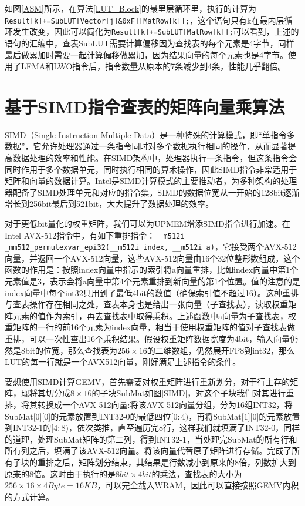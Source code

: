 如图\ref{ASM}所示，在算法\ref{LUT_Block}的最里层循环里，执行的计算为\verb|Result[k]+=SubLUT[Vector[j]&0xF][MatRow[k]];|，这个语句只有k在最内层循环发生改变，因此可以简化为\verb|Result[k]+=SubLUT[MatRow[k]];|可以看到，上述的语句的汇编中，查表SubLUT需要计算偏移因为查找表的每个元素是4字节，同样最后做累加时需要一起计算偏移做累加，因为结果向量的每个元素也是4字节。使用了LFMA和LWO指令后，指令数量从原本的7条减少到4条，性能几乎翻倍。

\section{基于SIMD指令查表的矩阵向量乘算法}
SIMD（Single Instruction Multiple Data）是一种特殊的计算模式，即“单指令多数据”，它允许处理器通过一条指令同时对多个数据执行相同的操作，从而显著提高数据处理的效率和性能。在SIMD架构中，处理器执行一条指令，但这条指令会同时作用于多个数据单元，同时执行相同的算术操作，因此SIMD指令非常适用于矩阵和向量的数据计算。Intel是SIMD计算模式的主要推动者，为多种架构的处理器配备了SIMD处理单元和对应的指令集\cite{IntelAVX}，SIMD的数据位宽从一开始的128bit逐渐增长到256bit最后到521bit，大大提升了数据处理的效率。

对于更低bit量化的权重矩阵，我们可以为UPMEM增添SIMD指令进行加速。在Intel AVX-512指令中，有如下重排指令：\verb|__m512i _mm512_permutexvar_epi32(__m512i index, __m512i a)|，它接受两个AVX-512向量，并返回一个AVX-512向量，这些AVX-512向量由16个32位整形数组成，这个函数的作用是：按照index向量中指示的索引将a向量重排，比如index向量中第1个元素值是3，表示会将a向量中第4个元素重排到新向量的第1个位置。值的注意的是index向量中每个int32只用到了最低4bit的数值（确保索引值不超过16）。这种重排与查表操作存在相同之处，查表本身也是给出一张向量（子查找表），读取权重矩阵元素的值作为索引，再去查找表中取得乘积。上述函数中a向量为子查找表，权重矩阵的一行的前16个元素为index向量，相当于使用权重矩阵的值对子查找表做重排，可以一次性查出16个乘积结果。假设权重矩阵数据宽度为4bit，输入向量仍然是8bit的位宽，那么查找表为$256\times 16$的二维数组，仍然展开FP8到int32，那么LUT的每一行就是一个AVX512向量，刚好满足上述指令的条件。

要想使用SIMD计算GEMV，首先需要对权重矩阵进行重新划分，对于行主存的矩阵，现将其切分成$8\times 16$的子块SubMat如图\ref{SIMD}，对这个子块我们对其进行重排，将其转换成一个AVX-512向量:将该AVX-512向量分组，分为16组INT32，将$\text{SubMat[0][0]}$的元素放置到INT32-0的最低四位$[0:4)$，再将$\text{SubMat[1][0]}$的元素放置到INT32-1的$[4:8)$，依次类推，直至遍历完8行，这样我们就填满了INT32-0，同样的道理，处理SubMat矩阵的第二列，得到INT32-1，当处理完SubMat的所有行和所有列之后，填满了该AVX-512向量。将该向量代替原子矩阵进行存储。完成了所有子块的重排之后，矩阵划分结束，其结果是行数减小到原来的8倍，列数扩大到原来的8倍。这时由于执行的是$8bit\times 4bit$的乘法，查找表的大小为$256\times 16\times 4Byte=16KB$，可以完全载入WRAM，因此可以直接按照GEMV内积的方式计算。

